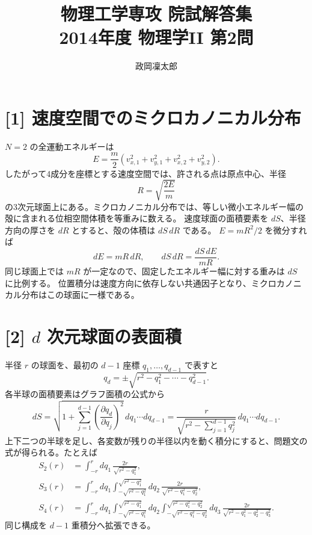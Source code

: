 \documentclass[11pt,a4paper]{article}
\title{物理工学専攻 院試解答集\\2014年度 物理学II 第2問}
\author{政岡凜太郎}
\date{}
\begin{document}
\maketitle

\section*{[1] 速度空間でのミクロカノニカル分布}
$N=2$ の全運動エネルギーは
\begin{equation}
 E=\frac{m}{2}(v_{x,1}^2+v_{y,1}^2+v_{x,2}^2+v_{y,2}^2).
\end{equation}
したがって4成分を座標とする速度空間では、許される点は原点中心、半径
\begin{equation}
 \boxed{R=\sqrt{\frac{2E}{m}}}
\end{equation}
の3次元球面上にある。ミクロカノニカル分布では、等しい微小エネルギー幅の殻に含まれる位相空間体積を等重みに数える。
速度球面の面積要素を $dS$、半径方向の厚さを $dR$ とすると、殻の体積は $dS\,dR$ である。
$E=mR^2/2$ を微分すれば
\begin{equation}
  dE=mR\,dR,\qquad dS\,dR=\frac{dS\,dE}{mR}.
\end{equation}
同じ球面上では $mR$ が一定なので、固定したエネルギー幅に対する重みは $dS$ に比例する。
位置積分は速度方向に依存しない共通因子となり、ミクロカノニカル分布はこの球面に一様である。

\section*{[2] $d$ 次元球面の表面積}
半径 $r$ の球面を、最初の $d-1$ 座標 $q_1,\ldots,q_{d-1}$ で表すと
\begin{equation}
 q_d=\pm\sqrt{r^2-q_1^2-\cdots-q_{d-1}^2}.
\end{equation}
各半球の面積要素はグラフ面積の公式から
\begin{equation}
 dS=\sqrt{1+\sum_{j=1}^{d-1}\left(\frac{\partial q_d}{\partial q_j}\right)^2}
       \,dq_1\cdots dq_{d-1}
    =\frac{r}{\sqrt{r^2-\sum_{j=1}^{d-1}q_j^2}}\,dq_1\cdots dq_{d-1}.
\end{equation}
上下二つの半球を足し、各変数が残りの半径以内を動く積分にすると、問題文の式が得られる。たとえば
\begin{align}
 S_2(r)&=\int_{-r}^{r}dq_1\,\frac{2r}{\sqrt{r^2-q_1^2}},\\
 S_3(r)&=\int_{-r}^{r}dq_1
 \int_{-\sqrt{r^2-q_1^2}}^{\sqrt{r^2-q_1^2}}dq_2\,
 \frac{2r}{\sqrt{r^2-q_1^2-q_2^2}},\\
 S_4(r)&=\int_{-r}^{r}dq_1
 \int_{-\sqrt{r^2-q_1^2}}^{\sqrt{r^2-q_1^2}}dq_2
 \int_{-\sqrt{r^2-q_1^2-q_2^2}}^{\sqrt{r^2-q_1^2-q_2^2}}dq_3\,
 \frac{2r}{\sqrt{r^2-q_1^2-q_2^2-q_3^2}}.
\end{align}
同じ構成を $d-1$ 重積分へ拡張できる。
\end{document}
